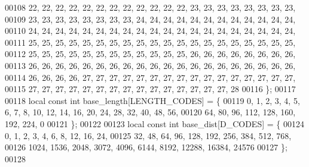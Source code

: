 \begin{DoxyCode}
00108 22, 22, 22, 22, 22, 22, 22, 22, 22, 22, 22, 22, 23, 23, 23, 23, 23, 23, 23, 23,
00109 23, 23, 23, 23, 23, 23, 23, 23, 24, 24, 24, 24, 24, 24, 24, 24, 24, 24, 24, 24,
00110 24, 24, 24, 24, 24, 24, 24, 24, 24, 24, 24, 24, 24, 24, 24, 24, 24, 24, 24, 24,
00111 25, 25, 25, 25, 25, 25, 25, 25, 25, 25, 25, 25, 25, 25, 25, 25, 25, 25, 25, 25,
00112 25, 25, 25, 25, 25, 25, 25, 25, 25, 25, 25, 25, 26, 26, 26, 26, 26, 26, 26, 26,
00113 26, 26, 26, 26, 26, 26, 26, 26, 26, 26, 26, 26, 26, 26, 26, 26, 26, 26, 26, 26,
00114 26, 26, 26, 26, 27, 27, 27, 27, 27, 27, 27, 27, 27, 27, 27, 27, 27, 27, 27, 27,
00115 27, 27, 27, 27, 27, 27, 27, 27, 27, 27, 27, 27, 27, 27, 27, 28
00116 \};
00117 
00118 local \textcolor{keyword}{const} \textcolor{keywordtype}{int} base\_length[LENGTH\_CODES] = \{
00119 0, 1, 2, 3, 4, 5, 6, 7, 8, 10, 12, 14, 16, 20, 24, 28, 32, 40, 48, 56,
00120 64, 80, 96, 112, 128, 160, 192, 224, 0
00121 \};
00122 
00123 local \textcolor{keyword}{const} \textcolor{keywordtype}{int} base\_dist[D\_CODES] = \{
00124     0,     1,     2,     3,     4,     6,     8,    12,    16,    24,
00125    32,    48,    64,    96,   128,   192,   256,   384,   512,   768,
00126  1024,  1536,  2048,  3072,  4096,  6144,  8192, 12288, 16384, 24576
00127 \};
00128 
\end{DoxyCode}
